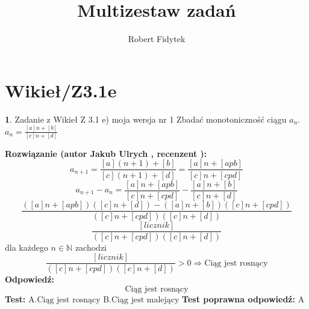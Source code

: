 \documentclass[12pt, a4paper]{article}
\title{Multizestaw zadań}
\author{Robert Fidytek}
\date{}
\theoremstyle{definition} %
\newtheorem{zad}{}
\newcommand{\kategoria}[1]{\section{#1}} %
\newcommand{\zadStart}[1]{\begin{zad}#1\newline} %
\newcommand{\zadStop}{\end{zad}}   %
\newcommand{\rozwStart}[2]{\noindent \textbf{Rozwiązanie (autor #1 , recenzent #2): }\newline} %
\newcommand{\rozwStop}{\newline}                                            %
\newcommand{\odpStart}{\noindent \textbf{Odpowiedź:}\newline}    %
\newcommand{\odpStop}{\newline}                                             %
\newcommand{\testStart}{\noindent \textbf{Test:}\newline} %
\newcommand{\testStop}{\newline} %
\newcommand{\kluczStart}{\noindent \textbf{Test poprawna odpowiedź:}\newline} %
\newcommand{\kluczStop}{\newline} %
\begin{document}
\maketitle


\kategoria{Wikieł/Z3.1e}
\zadStart{Zadanie z Wikieł Z 3.1 e) moja wersja nr 1}
Zbadać monotoniczność ciągu $a_{n}$.\\ $a_{n}=\frac{[a]n+[b]}{[c]n+[d]}$
\zadStop
\rozwStart{Jakub Ulrych}{}
$$a_{n+1}=\frac{[a](n+1)+[b]}{[c](n+1)+[d]}=\frac{[a]n+[apb]}{[c]n+[cpd]}$$
$$a_{n+1}-a_{n}=\frac{[a]n+[apb]}{[c]n+[cpd]}-\frac{[a]n+[b]}{[c]n+[d]}$$
$$\frac{([a]n+[apb])([c]n+[d])-([a]n+[b])([c]n+[cpd])}{([c]n+[cpd])([c]n+[d])}$$
$$\frac{[licznik]}{([c]n+[cpd])([c]n+[d])}$$
dla każdego $n\in\mathbb{N}$ zachodzi
$$\frac{[licznik]}{([c]n+[cpd])([c]n+[d])}>0\Rightarrow \text{Ciąg jest rosnący}$$
\rozwStop
\odpStart
$$\text{Ciąg jest rosnący}$$
\odpStop
\testStart
A.$\text{Ciąg jest rosnący}$
B.$\text{Ciąg jest malejący}$
\testStop
\kluczStart
A
\kluczStop
\end{document}
